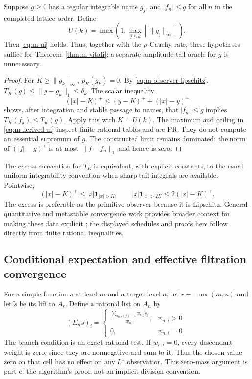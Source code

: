 \begin{proposition}
\label{prop:m-domination}
Suppose $g\ge0$ has a regular integrable name $g_j$, and $|f_n|\le g$ for
all $n$ in the completed lattice order.  Define
\begin{equation}
 U(k)=\max\left(1,
       \max_{j\le k}\left\lceil\|g_j\|_\infty\right\rceil\right).
 \label{eq:m-derived-ui}
\end{equation}
Then \eqref{eq:m-ui} holds.  Thus, together with the $\rho$ Cauchy rate,
these hypotheses suffice for Theorem~\ref{thm:m-vitali}; a separate
amplitude-tail oracle for $g$ is unnecessary.
\end{proposition}

\begin{proof}
For $K\ge\|g_k\|_\infty$, $p_K(g_k)=0$.  By
\eqref{eq:m-observer-lipschitz},
$T_K(g)\le\|g-g_k\|_1\le\delta_k$.
The scalar inequality
\[
 (|x|-K)^+\le (y-K)^+ + (|x|-y)^+
\]
shows, after integration and stable passage to names, that $|f_n|\le g$
implies $T_K(f_n)\le T_K(g)$.  Apply this with $K=U(k)$.
The maximum and ceiling in \eqref{eq:m-derived-ui} inspect finite rational
tables and are PR.  They do not compute an essential supremum of $g$.
The constructed limit remains dominated: the norm of
$(|f|-g)^+$ is at most $\|f-f_n\|_1$ and hence is zero.
\end{proof}

The excess convention for $T_K$ is equivalent, with explicit constants,
to the usual uniform-integrability convention when sharp tail integrals
are available.  Pointwise,
\[
 (|x|-K)^+\le |x|\mathbf1_{|x|>K},\qquad
 |x|\mathbf1_{|x|>2K}\le2(|x|-K)^+.
\]
The excess is preferable as the primitive observer because it is
Lipschitz.  General quantitative and metastable convergence work provides
broader context for making these data explicit
\cite{neri-pischke,avigad-dean-rute}; the displayed schedules and proofs here
follow directly from finite rational inequalities.

\subsection{Conditional expectation and effective filtration convergence}

For a simple function $s$ at level $m$ and a target level $n$, let
$r=\max(m,n)$ and let $\widetilde s$ be its lift to $A_r$.  Define a
rational list on $A_n$ by
\begin{equation}
 (E_ns)_i=
 \begin{cases}
 \displaystyle\frac{\sum_{\pi_{n,r}(j)=i}w_{r,j}\widetilde s_j}{w_{n,i}},
       &w_{n,i}>0,\\[6pt]
 0,&w_{n,i}=0.
 \end{cases}
 \label{eq:m-condexp}
\end{equation}
The branch condition is an exact rational test.  If $w_{n,i}=0$, every
descendant weight is zero, since they are nonnegative and sum to it.
Thus the chosen value zero on that cell has no effect on any $L^1$
observation.  This zero-mass argument is part of the algorithm's proof,
not an implicit division convention.

